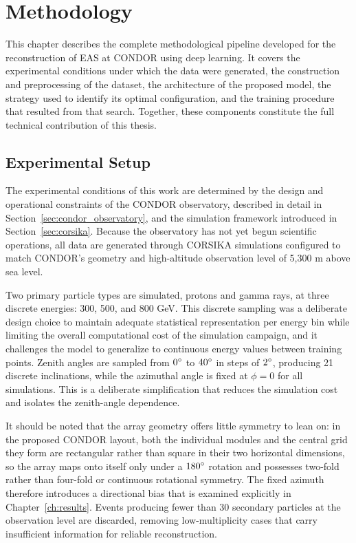 \chapter{Methodology}
\label{ch:methodology}

This chapter describes the complete methodological pipeline developed for the reconstruction of EAS at CONDOR using deep learning. It covers the experimental conditions under which the data were generated, the construction and preprocessing of the dataset, the architecture of the proposed model, the strategy used to identify its optimal configuration, and the training procedure that resulted from that search. Together, these components constitute the full technical contribution of this thesis.

\section{Experimental Setup}

The experimental conditions of this work are determined by the design and operational constraints of the CONDOR observatory, described in detail in Section~\ref{sec:condor_observatory}, and the simulation framework introduced in Section~\ref{sec:corsika}. Because the observatory has not yet begun scientific operations, all data are generated through CORSIKA simulations configured to match CONDOR's geometry and high-altitude observation level of 5,300 m above sea level.

Two primary particle types are simulated, protons and gamma rays, at three discrete energies: 300, 500, and 800 GeV. This discrete sampling was a deliberate design choice to maintain adequate statistical representation per energy bin while limiting the overall computational cost of the simulation campaign, and it challenges the model to generalize to continuous energy values between training points. Zenith angles are sampled from $0\degree$ to $40\degree$ in steps of $2\degree$, producing 21 discrete inclinations, while the azimuthal angle is fixed at $\phi = 0$ for all simulations. This is a deliberate simplification that reduces the simulation cost and isolates the zenith-angle dependence. 

It should be noted that the array geometry offers little symmetry to lean on: in the proposed CONDOR layout, both the individual modules and the central grid they form are rectangular rather than square in their two horizontal dimensions, so the array maps onto itself only under a $180\degree$ rotation and possesses two-fold rather than four-fold or continuous rotational symmetry. The fixed azimuth therefore introduces a directional bias that is examined explicitly in Chapter~\ref{ch:results}. Events producing fewer than 30 secondary particles at the observation level are discarded, removing low-multiplicity cases that carry insufficient information for reliable reconstruction.

